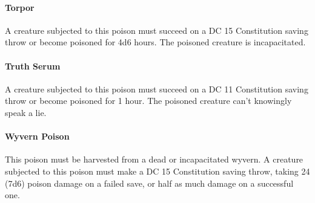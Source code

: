     \paragraph{Torpor}
        A creature subjected to this poison must succeed on a DC 15 Constitution saving throw or become poisoned for 4d6 hours.
        The poisoned creature is incapacitated.
    \paragraph{Truth Serum}
        A creature subjected to this poison must succeed on a DC 11 Constitution saving throw or become poisoned for 1 hour.
        The poisoned creature can't knowingly speak a lie.
    \paragraph{Wyvern Poison}
        This poison must be harvested from a dead or incapacitated wyvern.
        A creature subjected to this poison must make a DC 15 Constitution saving throw, taking 24 (7d6) poison damage on a failed save, or half as much damage on a successful one.
\newpage~\newpage
